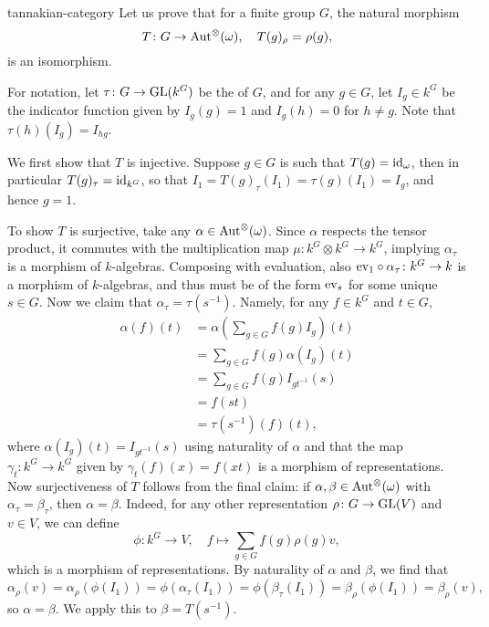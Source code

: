 \begin{example}{tannakian-category}
    Let us prove that for a finite group $G$, the natural morphism
    \[ T \colon G \to \textup{Aut}^\otimes(\omega), \quad T(g)_\rho = \rho(g) , \]
    is an isomorphism.
    
    For notation, let $\tau \colon G \to \textup{GL}(k^G)$ be the  of $G$, and for any $g \in G$, let $I_g \in k^G$ be the indicator function given by $I_g(g) = 1$ and $I_g(h) = 0$ for $h \ne g$. Note that $\tau(h)(I_g) = I_{hg}$.
    
    We first show that $T$ is injective. Suppose $g \in G$ is such that $T(g) = \textup{id}_\omega$, then in particular $T(g)_\tau = \textup{id}_{k^G}$, so that $I_1 = T(g)_\tau(I_1) = \tau(g)(I_1) = I_g$, and hence $g = 1$.
    
    To show $T$ is surjective, take any $\alpha \in \textup{Aut}^\otimes(\omega)$. Since $\alpha$ respects the tensor product, it commutes with the multiplication map $\mu \colon k^G \otimes k^G \to k^G$, implying $\alpha_\tau$ is a morphism of $k$-algebras. Composing with evaluation, also $\textup{ev}_1 \circ \alpha_\tau \colon k^G \to k$ is a morphism of $k$-algebras, and thus must be of the form $\textup{ev}_s$ for some unique $s \in G$. Now we claim that $\alpha_\tau = \tau(s^{-1})$. Namely, for any $f \in k^G$ and $t \in G$,
    \[ \begin{aligned}
        \alpha(f)(t)
            &= \alpha \left( \sum_{g \in G} f(g) I_g \right) (t) \\
            &= \sum_{g \in G} f(g) \alpha(I_g) (t) \\
            &= \sum_{g \in G} f(g) I_{gt^{-1}}(s) \\
            &= f(st) \\
            &= \tau(s^{-1})(f)(t) ,
    \end{aligned} \]
    where $\alpha(I_g)(t) = I_{gt^{-1}}(s)$ using naturality of $\alpha$ and that the map $\gamma_t \colon k^G \to k^G$ given by $\gamma_t(f)(x) = f(xt)$ is a morphism of representations. Now surjectiveness of $T$ follows from the final claim: if $\alpha, \beta \in \textup{Aut}^\otimes(\omega)$ with $\alpha_\tau = \beta_\tau$, then $\alpha = \beta$. Indeed, for any other representation $\rho \colon G \to \textup{GL}(V)$ and $v \in V$, we can define
    \[ \phi \colon k^G \to V, \quad f \mapsto \sum_{g \in G} f(g) \rho(g) v , \]
    which is a morphism of representations. By naturality of $\alpha$ and $\beta$, we find that
    \[ \alpha_\rho(v) = \alpha_\rho(\phi(I_1)) = \phi(\alpha_\tau(I_1)) = \phi(\beta_\tau(I_1)) = \beta_\rho(\phi(I_1)) = \beta_\rho(v) , \]
    so $\alpha = \beta$. We apply this to $\beta = T(s^{-1})$.
\end{example}

